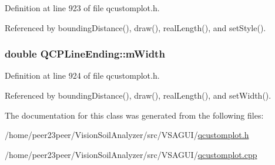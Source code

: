 Definition at line 923 of file qcustomplot.\+h.



Referenced by bounding\+Distance(), draw(), real\+Length(), and set\+Style().

\hypertarget{class_q_c_p_line_ending_aca89d21341133c20dc6825c33a5eac48}{}
\subsubsection[{m\+Width}]{\setlength{\rightskip}{0pt plus 5cm}double Q\+C\+P\+Line\+Ending\+::m\+Width\hspace{0.3cm}{\ttfamily [protected]}}\label{class_q_c_p_line_ending_aca89d21341133c20dc6825c33a5eac48}


Definition at line 924 of file qcustomplot.\+h.



Referenced by bounding\+Distance(), draw(), real\+Length(), and set\+Width().



The documentation for this class was generated from the following files\+:\begin{DoxyCompactItemize}
\item 
/home/peer23peer/\+Vision\+Soil\+Analyzer/src/\+V\+S\+A\+G\+U\+I/\hyperlink{qcustomplot_8h}{qcustomplot.\+h}\item 
/home/peer23peer/\+Vision\+Soil\+Analyzer/src/\+V\+S\+A\+G\+U\+I/\hyperlink{qcustomplot_8cpp}{qcustomplot.\+cpp}\end{DoxyCompactItemize}
